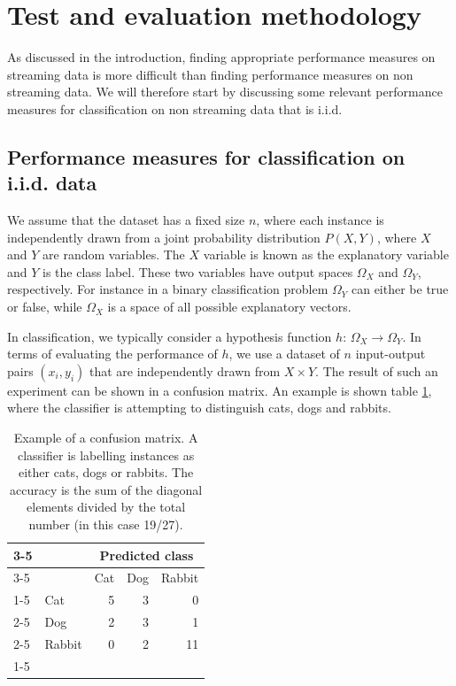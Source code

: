 \section{Test and evaluation methodology}
\label{sec:methodology}

As discussed in the introduction, finding appropriate performance measures on streaming data is more difficult than finding performance measures on non streaming data.  We will therefore start by discussing some relevant performance measures for classification on non streaming data that is i.i.d. 

\subsection{Performance measures for classification on i.i.d. data}
\label{sec:static}

We assume that the dataset has a fixed size $n$, where each instance is independently drawn from a joint probability distribution $P(X,Y)$, where $X$ and $Y$ are random variables. The $X$ variable is known as the explanatory variable and $Y$ is the class label.  These two variables have output spaces $\Omega_X$ and $\Omega_Y$, respectively.  For instance in a binary classification problem $\Omega_Y$ can either be true or false, while $\Omega_X$ is a space of all possible explanatory vectors.  

In classification, we typically consider a hypothesis function $h: \, \Omega_X \rightarrow \Omega_Y$.  In terms of evaluating the performance of $h$, we use a dataset of $n$ input-output pairs $(x_i, y_i)$ that are independently drawn from $X \times Y$. The result of such an experiment can be shown in a confusion matrix.  An example is shown table \ref{tab:catdograbbit}, where the classifier is attempting to distinguish cats, dogs and rabbits. 

\vspace{1ex}
\begin{table}
\centering
\begin{tabular}{ll|r|r|r|}
\cline{3-5}
&&  \multicolumn{3}{c|}{Predicted class}\\
\cline{3-5}
&& Cat & Dog & Rabbit\\ 
\cline{1-5}
\multicolumn{1}{ |c| }{\multirow{3}{*}{Actual class} }
 & Cat & 5 & 3& 0\\
\cline{2-5}
\multicolumn{1}{ |c| }{} & Dog & 2 & 3 & 1\\
\cline{2-5}
\multicolumn{1}{ |c| }{} & Rabbit & 0 & 2 & 11\\
\cline{1-5}
\end{tabular}
\caption{Example of a confusion matrix.  A classifier is labelling instances as either cats, dogs or rabbits.  The accuracy is the sum of the diagonal elements divided by the total number (in this case 19/27).}
\label{tab:catdograbbit}
\end{table}
\vspace{1ex}

